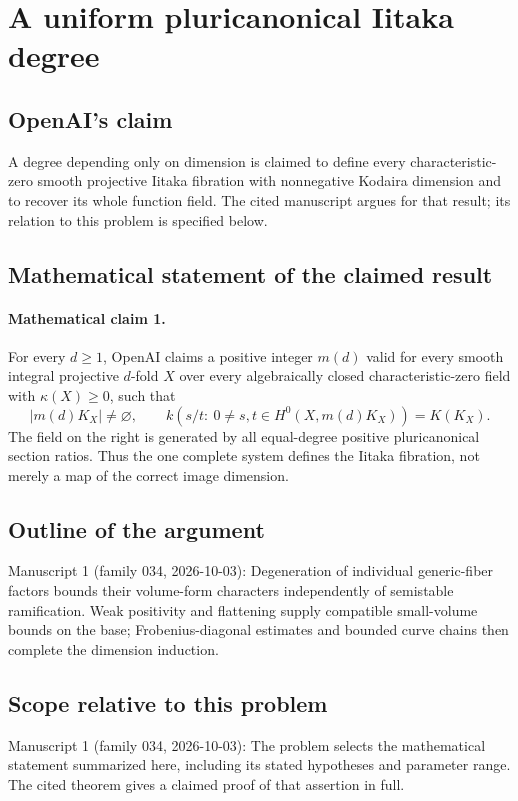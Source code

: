 \documentclass[11pt]{article}
\begin{document}
\section*{A uniform pluricanonical Iitaka degree}

\subsection{OpenAI's claim}
A degree depending only on dimension is claimed to define every characteristic-zero smooth projective Iitaka fibration with nonnegative Kodaira dimension and to recover its whole function field. The cited manuscript argues for that result; its relation to this problem is specified below.

\subsection{Mathematical statement of the claimed result}
\paragraph{Mathematical claim 1.} For every $d\ge1$, OpenAI claims a positive integer $m(d)$ valid for every smooth integral projective $d$-fold $X$ over every algebraically closed characteristic-zero field with $\kappa(X)\ge0$, such that
\[
|m(d)K_X|\ne\varnothing,\qquad
k(s/t:\ 0\ne s,t\in H^0(X,m(d)K_X))=K(K_X).
\]
The field on the right is generated by all equal-degree positive pluricanonical section ratios. Thus the one complete system defines the Iitaka fibration, not merely a map of the correct image dimension.

\subsection{Outline of the argument}
Manuscript 1 (family 034, 2026-10-03): Degeneration of individual generic-fiber factors bounds their volume-form characters independently of semistable ramification. Weak positivity and flattening supply compatible small-volume bounds on the base; Frobenius-diagonal estimates and bounded curve chains then complete the dimension induction.

\subsection{Scope relative to this problem}
Manuscript 1 (family 034, 2026-10-03): The problem selects the mathematical statement summarized here, including its stated hypotheses and parameter range. The cited theorem gives a claimed proof of that assertion in full.
\end{document}
